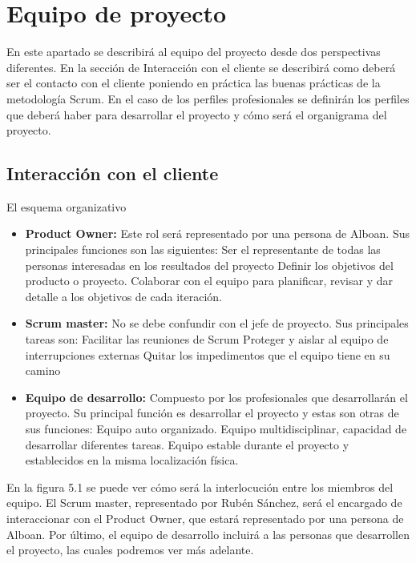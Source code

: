 \section{Equipo de proyecto}
En este apartado se describirá al equipo del proyecto desde dos perspectivas diferentes. En la sección de Interacción con el cliente se describirá como deberá ser el contacto con el cliente poniendo en práctica las buenas prácticas de la metodología Scrum. En el caso de los perfiles profesionales se definirán los perfiles que deberá haber para desarrollar el proyecto y cómo será el organigrama del proyecto.

\subsection{Interacción con el cliente}
El esquema organizativo

\begin{itemize}
	\item \textbf{Product Owner:} Este rol será representado por una persona de Alboan. Sus principales funciones son las siguientes:
		\subitem Ser el representante de todas las personas interesadas en los resultados del proyecto
		\subitem Definir los objetivos del producto o proyecto.
		\subitem Colaborar con el equipo para planificar, revisar y dar detalle a los objetivos de cada iteración.
	\item \textbf{Scrum master:} No se debe confundir con el jefe de proyecto. Sus principales tareas son:
		\subitem Facilitar las reuniones de Scrum
		\subitem Proteger y aislar al equipo de interrupciones externas
		\subitem Quitar los impedimentos que el equipo tiene en su camino
	\item \textbf{Equipo de desarrollo:} Compuesto por los profesionales que desarrollarán el proyecto. Su principal función es desarrollar el proyecto y estas son otras de sus funciones:
		\subitem Equipo auto organizado.
		\subitem Equipo multidisciplinar, capacidad de desarrollar diferentes tareas.
		\subitem Equipo estable durante el proyecto y establecidos en la misma localización física.

\end{itemize}

En la figura 5.1 se puede ver cómo será la interlocución entre los miembros del equipo. El Scrum master, representado por Rubén Sánchez, será el encargado de interaccionar con el Product Owner, que estará representado por una persona de Alboan. Por último, el equipo de desarrollo incluirá a las personas que desarrollen el proyecto, las cuales podremos ver más adelante.

